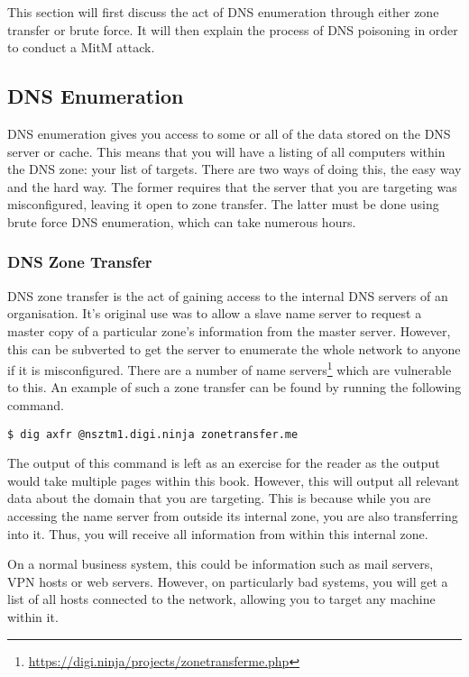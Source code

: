 		This section will first discuss the act of DNS enumeration through either zone transfer or brute force. 
		It will then explain the process of DNS poisoning in order to conduct a MitM attack. 

		\subsection{DNS Enumeration}
			DNS enumeration gives you access to some or all of the data stored on the DNS server or cache. 
			This means that you will have a listing of all computers within the DNS zone: your list of targets. 
			There are two ways of doing this, the easy way and the hard way. 
			The former requires that the server that you are targeting was misconfigured, leaving it open to zone transfer. 
			The latter must be done using brute force DNS enumeration, which can take numerous hours. 

			\subsubsection{DNS Zone Transfer}
				DNS zone transfer is the act of gaining access to the internal DNS servers of an organisation. 
				It's original use was to allow a slave name server to request a master copy of a particular zone's information from the master server. 
				However, this can be subverted to get the server to enumerate the whole network to anyone if it is misconfigured. 
				There are a number of name servers\footnote{\url{https://digi.ninja/projects/zonetransferme.php}} which are vulnerable to this. 
				An example of such a zone transfer can be found by running the following command. 
				\begin{lstlisting}[style=CLI]
					$ dig axfr @nsztm1.digi.ninja zonetransfer.me
				\end{lstlisting}
				The output of this command is left as an exercise for the reader as the output would take multiple pages within this book. 
				However, this will output all relevant data about the domain that you are targeting. 
				This is because while you are accessing the name server from outside its internal zone, you are also transferring into it. 
				Thus, you will receive all information from within this internal zone. 

				On a normal business system, this could be information such as mail servers, VPN hosts or web servers. 
				However, on particularly bad systems, you will get a list of all hosts connected to the network, allowing you to target any machine within it. 


